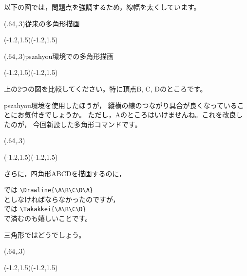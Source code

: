 \documentclass[a4j]{jarticle}
\begin{document}
以下の図では，問題点を強調するため，線幅を太くしています。

\begin{showEx}(.64,.3){従来の多角形描画}
\begin{zahyou}[ul=10mm](-1.2,1.5)(-1.2,1.5)
  {\allinethickness{4pt}\Drawline{\A\B\C\D\A}}%
\end{zahyou}
\end{showEx}

\begin{showEx}(.64,.3){\textsf{pszahyou}環境での多角形描画}
\begin{pszahyou}[ul=10mm](-1.2,1.5)(-1.2,1.5)
  \Drawline{\A\B\C\D\A}%
\end{pszahyou}
\end{showEx}

上の2つの図を比較してください。特に頂点B, C, Dのところです。

\textsf{pszahyou}環境を使用したほうが，
縦横の線のつながり具合が良くなっていることにお気付きでしょうか。
ただし，Aのところはいけませんね。これを改良したのが，
今回新設した多角形コマンドです。


\begin{showEx}(.64,.3){}
\begin{pszahyou}[ul=10mm](-1.2,1.5)(-1.2,1.5)
  \Takakkei{\A\B\C\D}%
\end{pszahyou}
\end{showEx}

さらに，四角形ABCDを描画するのに，
\begin{jquote}
では \verb+\Drawline{\A\B\C\D\A}+\\
としなければならなかったのですが，\\
では \verb+\Takakkei{\A\B\C\D}+\\
で済むのも嬉しいことです。
\end{jquote}

三角形ではどうでしょう。

\begin{showEx}(.64,.3){}
\begin{pszahyou*}[ul=10mm](-1.2,1.5)(-1.2,1.5)
  \Takakkei{\A\B\C}%
\end{pszahyou*}
\end{showEx}
\end{document}
